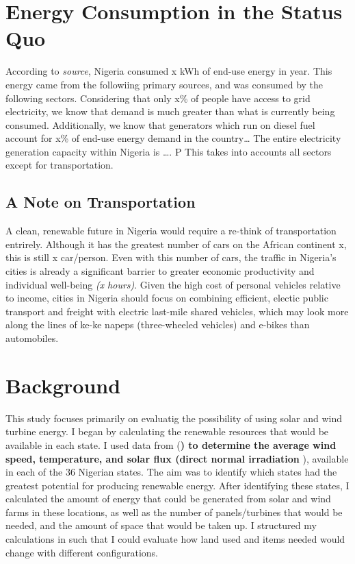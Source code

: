 \documentclass[
  letterpaper,
  DIV=11,
  numbers=noendperiod]{scrartcl}
\begin{document}
\hypertarget{energy-consumption-in-the-status-quo}{%
\section{Energy Consumption in the Status
Quo}\label{energy-consumption-in-the-status-quo}}

According to \emph{source}, Nigeria consumed x kWh of end-use energy in
year. This energy came from the followiing primary sources, and was
consumed by the following sectors. Considering that only x\% of people
have access to grid electricity, we know that demand is much greater
than what is currently being consumed. Additionally, we know that
generators which run on diesel fuel account for x\% of end-use energy
demand in the country\ldots{} The entire electricity generation capacity
within Nigeria is \ldots. P This takes into accounts all sectors except
for transportation.

\hypertarget{a-note-on-transportation}{%
\subsection{A Note on Transportation}\label{a-note-on-transportation}}

A clean, renewable future in Nigeria would require a re-think of
transportation entrirely. Although it has the greatest number of cars on
the African continent x, this is still x car/person. Even with this
number of cars, the traffic in Nigeria's cities is already a significant
barrier to greater economic productivity and individual well-being
\emph{(x hours)}. Given the high cost of personal vehicles relative to
income, cities in Nigeria should focus on combining efficient, electic
public transport and freight with electric last-mile shared vehicles,
which may look more along the lines of ke-ke napeps (three-wheeled
vehicles) and e-bikes than automobiles.

\hypertarget{background}{%
\section{Background}\label{background}}

This study focuses primarily on evaluatig the possibility of using solar
and wind turbine energy. I began by calculating the renewable resources
that would be available in each state. I used data from (\textbf{) to
determine the average wind speed, temperature, and solar flux (direct
normal irradiation }), available in each of the 36 Nigerian states. The
aim was to identify which states had the greatest potential for
producing renewable energy. After identifying these states, I calculated
the amount of energy that could be generated from solar and wind farms
in these locations, as well as the number of panels/turbines that would
be needed, and the amount of space that would be taken up. I structured
my calculations in such that I could evaluate how land used and items
needed would change with different configurations.
\end{document}
